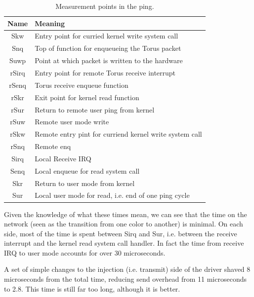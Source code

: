\documentclass[a4,10pt,preprint]{sigplanconf}
\begin{document}
\begin{table}[ht]
\centering
 \begin{tabular}{c p{2.5in}} \hline\hline Name & Meaning \\ \hline
 Skw & Entry point for curried kernel write system call \\ \hline
 Snq & Top of function for enqueueing the Torus packet \\ \hline
 Suwp & Point at which packet is written to the hardware \\ \hline
 rSirq & Entry point for remote Torus receive interrupt \\ \hline
  rSenq & Torus receive enqueue function \\ \hline
  rSkr & Exit point for kernel read function \\ \hline
  rSur & Return to remote user ping from kernel \\ \hline
  rSuw & Remote user mode write \\ \hline
  rSkw & Remote entry pint for curriend kernel write system call \\ \hline
  rSnq & Remote enq \\ \hline
  Sirq & Local Receive IRQ \\ \hline
  Senq & Local enqueue for read system call \\ \hline
  Skr & Return to user mode from kernel \\ \hline 
  Sur & Local user mode for read, i.e. end of one ping cycle
  \end{tabular}
\caption{\label{pingnames}Measurement points in the ping.}
\end{table}

Given the knowledge of what these times mean, we can see that the time on the network (seen as the transition from one color to another) is minimal. On each side, most of the time is spent between Sirq and Sur, i.e. between the receive interrupt and the kernel read system call handler. In fact the time from receive IRQ to user mode accounts for over 30 microseconds. 

A set of simple changes to the injection (i.e. transmit) side of the driver shaved 8 microseconds from the total time, 
reducing send overhead from 11 microseconds to 2.8. This time is still far too long, although it is better. 
\end{document}
